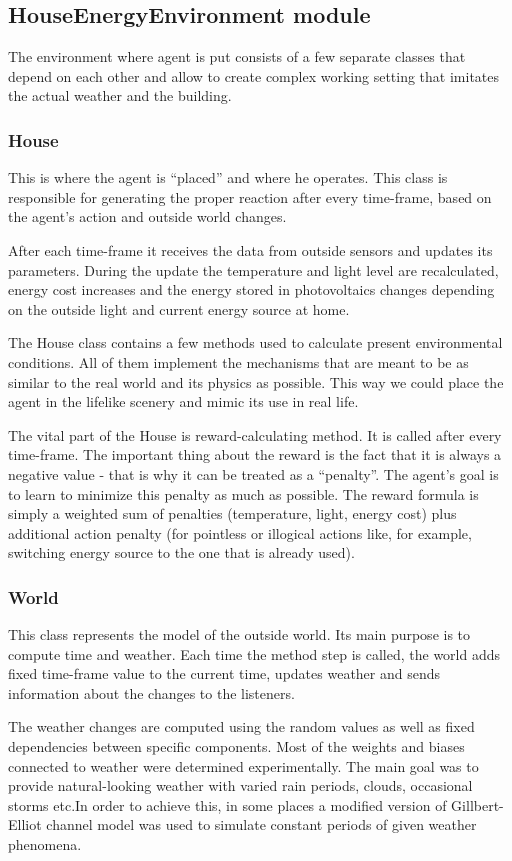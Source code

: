\documentclass{article}
\begin{document}
\subsection{HouseEnergyEnvironment module}
The environment where agent is put consists of a few separate classes that depend on each other and allow to create complex working setting that imitates the actual weather and the building.
\subsubsection{House}
This is where the agent is “placed” and where he operates. This class is responsible for generating the proper reaction after every time-frame, based on the agent’s action and outside world changes.

After each time-frame it receives the data from outside sensors and updates its parameters. During the update the temperature and light level are recalculated, energy cost increases and the energy stored in photovoltaics changes depending on the outside light and current energy source at home.

The House class contains a few methods used to calculate present environmental conditions. All of them implement the mechanisms that are meant to be as similar to the real world and its physics as possible. This way we could place the agent in the lifelike scenery and mimic its use in real life.

The vital part of the House is reward-calculating method. It is called after every time-frame. The important thing about the reward is the fact that it is always a negative value - that is why it can be treated as a “penalty”. The agent’s goal is to learn to minimize this penalty as much as possible. The reward formula is simply a weighted sum of penalties (temperature, light, energy cost) plus additional action penalty (for pointless or illogical actions like, for example, switching energy source to the one that is already used). 

\subsubsection{World}
This class represents the model of the outside world. Its main purpose is to compute time and weather. Each time the method step is called, the world adds fixed time-frame value to the current time, updates weather and sends information about the changes to the listeners.

The weather changes are computed using the random values as well as fixed dependencies between specific components. Most of the weights and biases connected to weather were determined experimentally. The main goal was to provide natural-looking weather with varied rain periods, clouds, occasional storms etc.In order to achieve this, in some places a modified version of Gillbert-Elliot channel model was used to simulate constant periods of given weather phenomena.
\end{document}
